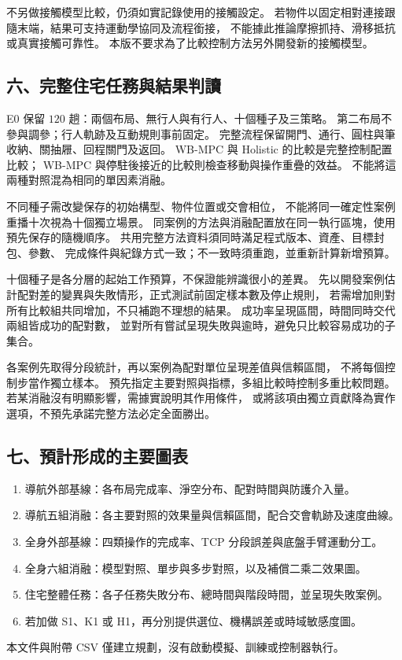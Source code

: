 不另做接觸模型比較，仍須如實記錄使用的接觸設定。
若物件以固定相對連接跟隨末端，結果可支持運動學協同及流程銜接，
不能據此推論摩擦抓持、滑移抵抗或真實接觸可靠性。
本版不要求為了比較控制方法另外開發新的接觸模型。

\subsection*{六、完整住宅任務與結果判讀}

E0 保留 $120$ 趟：兩個布局、無行人與有行人、十個種子及三策略。
第二布局不參與調參；行人軌跡及互動規則事前固定。
完整流程保留開門、通行、圓柱與筆收納、關抽屜、回程關門及返回。
WB-MPC 與 Holistic 的比較是完整控制配置比較；
WB-MPC 與停駐後接近的比較則檢查移動與操作重疊的效益。
不能將這兩種對照混為相同的單因素消融。

不同種子需改變保存的初始構型、物件位置或交會相位，
不能將同一確定性案例重播十次視為十個獨立場景。
同案例的方法與消融配置放在同一執行區塊，使用預先保存的隨機順序。
共用完整方法資料須同時滿足程式版本、資產、目標封包、參數、
完成條件與紀錄方式一致；不一致時須重跑，並重新計算新增預算。

十個種子是各分層的起始工作預算，不保證能辨識很小的差異。
先以開發案例估計配對差的變異與失敗情形，正式測試前固定樣本數及停止規則，
若需增加則對所有比較組共同增加，不只補跑不理想的結果。
成功率呈現區間，時間同時交代兩組皆成功的配對數，
並對所有嘗試呈現失敗與逾時，避免只比較容易成功的子集合。

各案例先取得分段統計，再以案例為配對單位呈現差值與信賴區間，
不將每個控制步當作獨立樣本。
預先指定主要對照與指標，多組比較時控制多重比較問題。
若某消融沒有明顯影響，需據實說明其作用條件，
或將該項由獨立貢獻降為實作選項，不預先承諾完整方法必定全面勝出。

\subsection*{七、預計形成的主要圖表}

\begin{enumerate}
    \item 導航外部基線：各布局完成率、淨空分布、配對時間與防護介入量。
    \item 導航五組消融：各主要對照的效果量與信賴區間，配合交會軌跡及速度曲線。
    \item 全身外部基線：四類操作的完成率、TCP 分段誤差與底盤手臂運動分工。
    \item 全身六組消融：模型對照、單步與多步對照，以及補償二乘二效果圖。
    \item 住宅整體任務：各子任務失敗分布、總時間與階段時間，並呈現失敗案例。
    \item 若加做 S1、K1 或 H1，再分別提供選位、機構誤差或時域敏感度圖。
\end{enumerate}

本文件與附帶 CSV 僅建立規劃，沒有啟動模擬、訓練或控制器執行。
